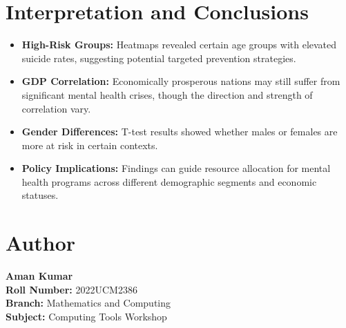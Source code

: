 \documentclass[12pt,a4paper]{article}
\begin{document}
\section{Interpretation and Conclusions}
\begin{itemize}
  \item \textbf{High-Risk Groups:} Heatmaps revealed certain age groups with elevated suicide rates, suggesting potential targeted prevention strategies.
  \item \textbf{GDP Correlation:} Economically prosperous nations may still suffer from significant mental health crises, though the direction and strength of correlation vary.
  \item \textbf{Gender Differences:} T-test results showed whether males or females are more at risk in certain contexts.
  \item \textbf{Policy Implications:} Findings can guide resource allocation for mental health programs across different demographic segments and economic statuses.
\end{itemize}

\section*{Author}
\textbf{Aman Kumar} \\
\textbf{Roll Number:} 2022UCM2386 \\
\textbf{Branch:} Mathematics and Computing \\
\textbf{Subject:} Computing Tools Workshop
\end{document}
